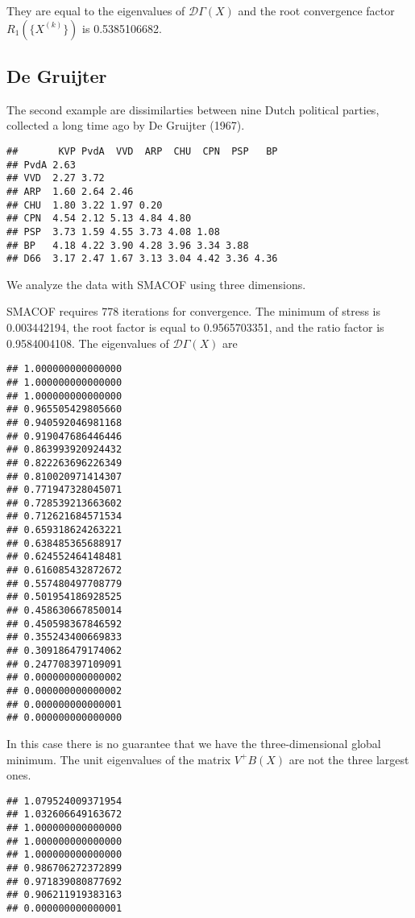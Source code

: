 \documentclass[
  12pt,
]{article}
\begin{document}
They are equal to the eigenvalues of \(\mathcal{D}\Gamma(X)\) and the root convergence factor
\(R_1(\{X^{(k)}\})\) is 0.5385106682.

\subsection{De Gruijter}\label{de-gruijter}

The second example are dissimilarties between nine Dutch political parties, collected a long time ago by De Gruijter (1967).

\begin{verbatim}
##       KVP PvdA  VVD  ARP  CHU  CPN  PSP   BP
## PvdA 2.63                                   
## VVD  2.27 3.72                              
## ARP  1.60 2.64 2.46                         
## CHU  1.80 3.22 1.97 0.20                    
## CPN  4.54 2.12 5.13 4.84 4.80               
## PSP  3.73 1.59 4.55 3.73 4.08 1.08          
## BP   4.18 4.22 3.90 4.28 3.96 3.34 3.88     
## D66  3.17 2.47 1.67 3.13 3.04 4.42 3.36 4.36
\end{verbatim}

We analyze the data with SMACOF using three dimensions.

SMACOF requires 778 iterations for convergence. The minimum of stress is 0.003442194, the root factor is equal to 0.9565703351, and the ratio factor is 0.9584004108. The eigenvalues of \(\mathcal{D}\Gamma(X)\) are

\begin{verbatim}
## 1.000000000000000 
## 1.000000000000000 
## 1.000000000000000 
## 0.965505429805660 
## 0.940592046981168 
## 0.919047686446446 
## 0.863993920924432 
## 0.822263696226349 
## 0.810020971414307 
## 0.771947328045071 
## 0.728539213663602 
## 0.712621684571534 
## 0.659318624263221 
## 0.638485365688917 
## 0.624552464148481 
## 0.616085432872672 
## 0.557480497708779 
## 0.501954186928525 
## 0.458630667850014 
## 0.450598367846592 
## 0.355243400669833 
## 0.309186479174062 
## 0.247708397109091 
## 0.000000000000002 
## 0.000000000000002 
## 0.000000000000001 
## 0.000000000000000
\end{verbatim}

In this case there is no guarantee that we have the three-dimensional global minimum. The unit eigenvalues of the matrix \(V^+B(X)\) are not the three largest ones.

\begin{verbatim}
## 1.079524009371954 
## 1.032606649163672 
## 1.000000000000000 
## 1.000000000000000 
## 1.000000000000000 
## 0.986706272372899 
## 0.971839080877692 
## 0.906211919383163 
## 0.000000000000001
\end{verbatim}
\end{document}
